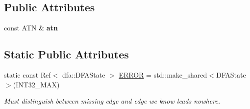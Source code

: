 \subsection*{Public Attributes}
\begin{DoxyCompactItemize}
\item 
\mbox{\label{classantlr4_1_1atn_1_1ATNSimulator_afec8e232a4c11c864ecc770252a2bcb6}} 
const A\+TN \& {\bfseries atn}
\end{DoxyCompactItemize}
\subsection*{Static Public Attributes}
\begin{DoxyCompactItemize}
\item 
\mbox{\label{classantlr4_1_1atn_1_1ATNSimulator_a1a88e9a52986711b319268c6e6faf6c6}} 
static const Ref$<$ dfa\+::\+D\+F\+A\+State $>$ \hyperlink{classantlr4_1_1atn_1_1ATNSimulator_a1a88e9a52986711b319268c6e6faf6c6}{E\+R\+R\+OR} = std\+::make\+\_\+shared$<$D\+F\+A\+State$>$(I\+N\+T32\+\_\+\+M\+AX)
\begin{DoxyCompactList}\small\item\em Must distinguish between missing edge and edge we know leads nowhere. \end{DoxyCompactList}\end{DoxyCompactItemize}
